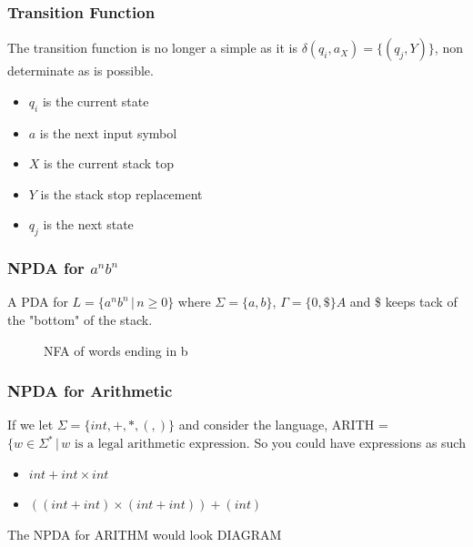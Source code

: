 \subsubsection{Transition Function}
The transition function is no longer a simple as it is $\delta(q_i,a_X) = \{(q_j,Y)\}$, non determinate as {} is possible.
\begin{itemize}
    \item $q_i$ is the current state
    \item $a$ is the next input symbol
    \item $X$ is the current stack top
    \item $Y$ is the stack stop replacement 
    \item $q_j$ is the next state
\end{itemize}
\subsubsection{NPDA for $a^nb^n$}
A PDA for $L = \{a^nb^n\,|\, n\geq0\}$ where $\Sigma = \{a,b\}$, $\Gamma = \{0,\$\}A$ and \$ keeps tack of the "bottom" of the stack.
\begin{figure}[H]
    \centering
    \caption{NFA of words ending in b}
    \label{fig:NFA*}
\end{figure}
\subsubsection{NPDA for Arithmetic}
If we let $\Sigma = \{ int,+,*,(,)\}$ and consider the language, ARITH = $\{ w \in \Sigma^*\,|\, w \text{ is a legal arithmetic expression}$. So you could have expressions as such
\begin{itemize}
    \item $int + int \times int$
    \item $((int + int) \times (int + int)) + (int)$
\end{itemize}
The NPDA for ARITHM would look 
DIAGRAM
